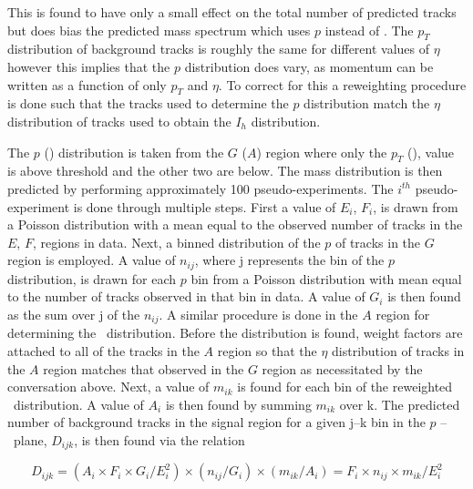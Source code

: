 This is found to have only a small effect on the total number of predicted tracks but does bias the predicted mass spectrum which uses $p$ instead of \pt.
The $p_T$ distribution of background tracks is roughly the same for different values of $\eta$ 
however this implies that the $p$ distribution does vary, as momentum can be written
as a function of only $p_T$ and $\eta$. To correct for this a reweighting procedure is done such that the tracks
used to determine the $p$ distribution match the $\eta$ distribution of tracks used to obtain the $I_h$ distribution.

The $p$ (\ih) distribution
is taken from the $G$ ($A$) region where only the $p_T$  (\ias), value is above threshold and the other two are below. The mass distribution is then predicted by performing
approximately 100 pseudo-experiments. The $i^{th}$ pseudo-experiment is done through multiple steps. First a value of $E_{i}$, $F_i$, is drawn from a Poisson
distribution with a mean equal to the observed number of tracks in the $E$, $F$, regions in data.
Next, a binned distribution of the $p$ of tracks in the $G$ region is employed. A value of $n_{ij}$, where j represents the bin of the $p$ distribution, is drawn for
each $p$ bin from a Poisson distribution with mean equal to the number of tracks observed in that bin in data. A value of $G_i$ is then found as the sum over j of the
$n_{ij}$. A similar procedure is done in the $A$ region for determining the \ih\ distribution. Before the distribution is found, weight factors are attached to all of
the tracks in the $A$ region so that the $\eta$ distribution of tracks in the $A$ region matches that observed in the $G$ region as necessitated by the conversation
above. Next, a value of $m_{ik}$ is found for each bin of the reweighted \ih\ distribution. A value of $A_i$ is then found by summing $m_{ik}$ over k.
The predicted number of background tracks in the signal region for a given j--k bin in the $p$ -- \dedx\ plane, $D_{ijk}$, is then found via the relation

\begin{equation}
D_{ijk} = (A_i \times F_i \times G_i / E_{i}^{2}) \times (n_{ij}/G_i) \times (m_{ik}/A_i) = F_i \times n_{ij} \times m_{ik} / E_{i}^{2}
\label{eq:MassPrediction}
\end{equation}

